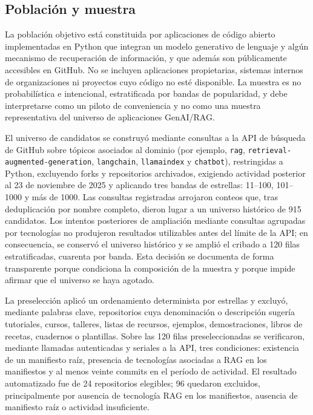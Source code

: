 \subsection{Población y muestra}

La población objetivo está constituida por aplicaciones de código abierto implementadas en Python que integran un modelo generativo de lenguaje y algún mecanismo de recuperación de información, y que además son públicamente accesibles en GitHub. No se incluyen aplicaciones propietarias, sistemas internos de organizaciones ni proyectos cuyo código no esté disponible. La muestra es no probabilística e intencional, estratificada por bandas de popularidad, y debe interpretarse como un piloto de conveniencia y no como una muestra representativa del universo de aplicaciones GenAI/RAG.

El universo de candidatos se construyó mediante consultas a la API de búsqueda de GitHub sobre tópicos asociados al dominio (por ejemplo, \texttt{rag}, \texttt{retrieval-augmented-generation}, \texttt{langchain}, \texttt{llamaindex} y \texttt{chatbot}), restringidas a Python, excluyendo forks y repositorios archivados, exigiendo actividad posterior al 23 de noviembre de 2025 y aplicando tres bandas de estrellas: 11--100, 101--1000 y más de 1000. Las consultas registradas arrojaron conteos que, tras deduplicación por nombre completo, dieron lugar a un universo histórico de 915 candidatos. Los intentos posteriores de ampliación mediante consultas agrupadas por tecnologías no produjeron resultados utilizables antes del límite de la API; en consecuencia, se conservó el universo histórico y se amplió el cribado a 120 filas estratificadas, cuarenta por banda. Esta decisión se documenta de forma transparente porque condiciona la composición de la muestra y porque impide afirmar que el universo se haya agotado.

La preselección aplicó un ordenamiento determinista por estrellas y excluyó, mediante palabras clave, repositorios cuya denominación o descripción sugería tutoriales, cursos, talleres, listas de recursos, ejemplos, demostraciones, libros de recetas, cuadernos o plantillas. Sobre las 120 filas preseleccionadas se verificaron, mediante llamadas autenticadas y seriales a la API, tres condiciones: existencia de un manifiesto raíz, presencia de tecnologías asociadas a RAG en los manifiestos y al menos veinte commits en el período de actividad. El resultado automatizado fue de 24 repositorios elegibles; 96 quedaron excluidos, principalmente por ausencia de tecnología RAG en los manifiestos, ausencia de manifiesto raíz o actividad insuficiente.


